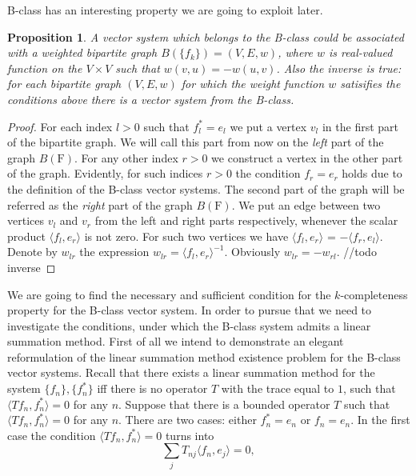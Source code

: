 \documentclass[12pt]{article}
\newtheorem{prop}{Proposition}
\theoremstyle{definition}
\newcommand{\fsys}{\mathrm{F}}
\numberwithin{remark}{section}
\numberwithin{theorem}{section}
\numberwithin{prop}{section}
\numberwithin{equation}{section}
\numberwithin{lemma}{section}
\numberwithin{prop_under_lemma}{lemma}
\begin{document}
    B-class has an interesting property we are going to exploit later.
    \begin{prop}
        A vector system which belongs to the B-class could be associated with a 
        weighted bipartite graph $B(\{f_k\}) = (V, E, w)$, where $w$ is real-valued function on the $V\times V$ such that
        $w(v, u) = -w(u, v)$.
        Also the inverse is true: for each bipartite graph $(V, E, w)$ for which the weight function
        $w$ satisifies the conditions above there is a vector system from the B-class.
    \end{prop}
    \begin{proof}
        For each index $l > 0$ such that $f^*_l = e_l$ we put a vertex $v_l$ in the first part of the bipartite graph.
        We will call this part from now on the \textit{left} part of the graph $B(\fsys)$.
        For any other index $r > 0$ we construct a vertex in the other part of the graph.
        Evidently, for such indices $r > 0$ the condition $f_r = e_r$ holds due to the definition of the B-class vector systems.
        The second part of the graph will be referred as the \textit{right} part of the graph $B(\fsys)$.
        We put an edge between two vertices $v_l$ and $v_r$ from the left and right parts respectively,
        whenever the scalar product $\langle f_l, e_r \rangle$ is not zero.
        For such two vertices we have $\langle f_l, e_r \rangle$ = $-\langle f_r, e_l \rangle$.
        Denote by $w_{lr}$ the expression $w_{lr} = \langle f_l, e_r \rangle^{-1}$.
        Obviously $w_{lr} = -w_{rl}$.
        //todo inverse
    \end{proof}
    We are going to find the necessary and sufficient condition for the $k$-completeness property for the B-class vector system. In order to pursue that
    we need to investigate the conditions, under which the B-class system admits a linear summation method.
    First of all we intend to demonstrate an elegant reformulation of the linear summation method existence problem for
    the B-class vector systems.
    Recall that there exists a linear summation method for the system $\{f_n\}, \{f^*_n\}$
    iff there is no operator $T$ with the trace equal to $1$, such that $\langle Tf_n, f_n^*\rangle = 0$ for any $n$.
    Suppose that there is a bounded operator $T$ such that $\langle Tf_n, f_n^*\rangle = 0$ for any $n$.
    There are two cases: either $f^*_n = e_n$ or $f_n = e_n$.
    In the first case the condition $\langle Tf_n, f_n^*\rangle = 0$ turns into
    \begin{equation}
        \label{left-eqn}
        \sum_j T_{nj} \langle f_n, e_j \rangle = 0,
    \end{equation}
\end{document}

